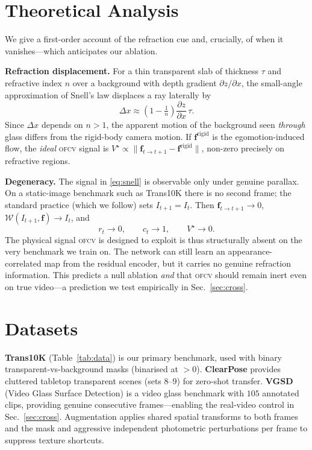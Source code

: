 \documentclass{article}
\newcommand{\ofcv}{\textsc{ofcv}}
\begin{document}
\section{Theoretical Analysis}
\label{sec:theory}
We give a first-order account of the refraction cue and, crucially, of when it
vanishes---which anticipates our ablation.

\textbf{Refraction displacement.} For a thin transparent slab of thickness
$\tau$ and refractive index $n$ over a background with depth gradient
$\partial z/\partial x$, the small-angle approximation of Snell's law displaces a
ray laterally by
\begin{equation}
\Delta x \approx \left(1-\tfrac{1}{n}\right)\frac{\partial z}{\partial x}\,\tau .
\label{eq:snell}
\end{equation}
Since $\Delta x$ depends on $n>1$, the apparent motion of the background seen
\emph{through} glass differs from the rigid-body camera motion. If
$\mathbf{f}^{\mathrm{rigid}}$ is the egomotion-induced flow, the \emph{ideal}
\ofcv{} signal is $V^\star\propto\lVert\mathbf{f}_{t\to t+1}-\mathbf{f}^{\mathrm{rigid}}\rVert$,
non-zero precisely on refractive regions.

\textbf{Degeneracy.} The signal in \eqref{eq:snell} is observable only under
genuine parallax. On a static-image benchmark such as Trans10K there is no
second frame; the standard practice (which we follow) sets $I_{t+1}=I_t$. Then
$\mathbf{f}_{t\to t+1}\!\to\!0$, $\mathcal{W}(I_{t+1},\mathbf{f})\!\to\!I_t$, and
\begin{equation}
r_t\to 0,\qquad c_t\to 1,\qquad V^\star\to 0 .
\end{equation}
The physical signal \ofcv{} is designed to exploit is thus structurally absent
on the very benchmark we train on. The network can still learn an
appearance-correlated map from the residual encoder, but it carries no genuine
refraction information. This predicts a null ablation \emph{and} that \ofcv{}
should remain inert even on true video---a prediction we test empirically in
Sec.~\ref{sec:cross}.

\section{Datasets}
\textbf{Trans10K} \cite{xie2020translab} (Table~\ref{tab:data}) is our primary
benchmark, used with binary transparent-vs-background masks (binarised at $>0$).
\textbf{ClearPose} \cite{chen2022clearpose} provides cluttered tabletop
transparent scenes (sets 8--9) for zero-shot transfer. \textbf{VGSD}~\cite{liu2024vgsd}
(Video Glass Surface Detection) is a video glass benchmark with $105$ annotated
clips, providing genuine consecutive frames---enabling the real-video control in
Sec.~\ref{sec:cross}. Augmentation
applies shared spatial transforms to both frames and the mask and aggressive
independent photometric perturbations per frame to suppress texture shortcuts.
\end{document}
